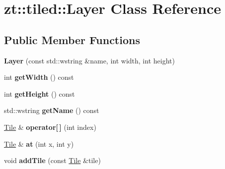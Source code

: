 \hypertarget{classzt_1_1tiled_1_1_layer}{}\section{zt\+:\+:tiled\+:\+:Layer Class Reference}
\label{classzt_1_1tiled_1_1_layer}
\subsection*{Public Member Functions}
\begin{DoxyCompactItemize}
\item 
\mbox{\label{classzt_1_1tiled_1_1_layer_a13adb1b0b39d84449c87459dd975977e}} 
{\bfseries Layer} (const std\+::wstring \&name, int width, int height)
\item 
\mbox{\label{classzt_1_1tiled_1_1_layer_a1ea8418548abbc6af971692debe2f960}} 
int {\bfseries get\+Width} () const
\item 
\mbox{\label{classzt_1_1tiled_1_1_layer_aa492ded76f951bfce818dd4a10b35133}} 
int {\bfseries get\+Height} () const
\item 
\mbox{\label{classzt_1_1tiled_1_1_layer_a0e0978346385a32ccd397ce260179644}} 
std\+::wstring {\bfseries get\+Name} () const
\item 
\mbox{\label{classzt_1_1tiled_1_1_layer_ae3275e8593025156d90addcaa424f447}} 
\hyperlink{classzt_1_1tiled_1_1_tile}{Tile} \& {\bfseries operator\mbox{[}$\,$\mbox{]}} (int index)
\item 
\mbox{\label{classzt_1_1tiled_1_1_layer_a4d99e5bcfc8ab9d463822de93dfa6cbf}} 
\hyperlink{classzt_1_1tiled_1_1_tile}{Tile} \& {\bfseries at} (int x, int y)
\item 
\mbox{\label{classzt_1_1tiled_1_1_layer_a3d02819c7de5dba5028b186c09ebf411}} 
void {\bfseries add\+Tile} (const \hyperlink{classzt_1_1tiled_1_1_tile}{Tile} \&tile)
\end{DoxyCompactItemize}
